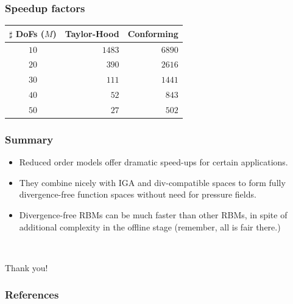 \documentclass{beamer}
\begin{document}
\begin{frame}
  \frametitle{Speedup factors}

  \begin{center}
    \bgroup{}
    \begin{tabular}{crr}
      $\sharp$ DoFs ($M$) & {\bf Taylor-Hood} & {\bf Conforming} \\
      \hline $10$ & $1483$ & $6890$ \\
      $20$ & $390$ & $2616$ \\
      $30$ & $111$ & $1441$ \\
      $40$ & $52$ & $843$ \\
      $50$ & $27$ & $502$ \\
      \hline
    \end{tabular}
    \egroup
  \end{center}

\end{frame}

\begin{frame}
  \frametitle{Summary}
  \begin{itemize}
  \item Reduced order models offer dramatic speed-ups for certain applications.
  \item They combine nicely with IGA and div-compatible spaces to form fully
    divergence-free function spaces without need for pressure fields.
  \item Divergence-free RBMs can be much faster than other RBMs, in spite of additional complexity
    in the offline stage (remember, all is fair there.)
  \end{itemize}
  ~\\ \begin{center} Thank you! \end{center}
\end{frame}

\begin{frame}
  \frametitle{References}

  \printbibliography
\end{frame}
\end{document}
